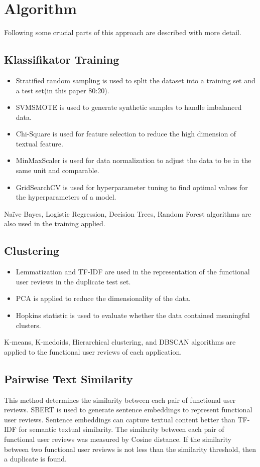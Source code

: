 \section{Algorithm}
Following some crucial parts of this approach are described with more detail. 

\subsection{Klassifikator Training}

\begin{itemize}
\item Stratified random sampling is used to split the dataset into a training set and a test set(in this paper 80:20).
\item SVMSMOTE is used to generate synthetic samples to handle imbalanced data.
\item Chi-Square is used for feature selection to reduce
the high dimension of textual feature.
\item MinMaxScaler is used for data normalization to adjust the
data to be in the same unit and comparable.
\item GridSearchCV is used for hyperparameter tuning to find optimal values for the hyperparameters of a model.
\end{itemize}

Naïve Bayes, Logistic Regression, Decision Trees, Random Forest algorithms are also used in the training applied.

\subsection{Clustering}
\begin{itemize}
\item Lemmatization and TF-IDF are used in the representation of the functional user reviews in the duplicate test set.
\item PCA is applied to reduce the dimensionality of the data.
\item Hopkins statistic is used to evaluate whether the data
contained meaningful clusters.
\end{itemize}
K-means, K-medoids, Hierarchical clustering, and DBSCAN algorithms are applied to the functional user reviews of each application. 

\subsection{Pairwise Text Similarity}
This method determines the similarity between each pair of functional user reviews. SBERT is used to generate sentence embeddings to represent functional user reviews. Sentence embeddings can capture textual content better than TF-IDF for semantic textual similarity. The similarity between each pair of functional user reviews was measured by Cosine distance. If the similarity between two functional user reviews is not less than the similarity threshold, then a duplicate is found.


